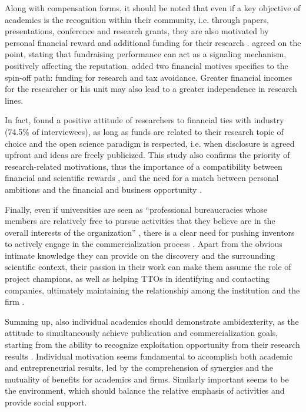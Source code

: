 Along with compensation forms, it should be noted that even if a key objective of academics is the recognition within their community, i.e. through papers, presentations, conference and research grants, they are also motivated by personal financial reward and additional funding for their research \citep{Siegel2003a, Link2007, Fini2009}. \citet{DEste2007, DEste2011} agreed on the point, stating that fundraising performance can act as a signaling mechanism, positively affecting the reputation. \citet{Rizzo2015} added two financial motives specifics to the spin-off path: funding for research and tax avoidance. Greater financial incomes for the researcher or his unit may also lead to a greater independence in research lines.

In fact, \citet{DEste2011} found a positive attitude of researchers to financial ties with industry (74.5\% of interviewees), as long as funds are related to their research topic of choice and the open science paradigm is respected, i.e. when disclosure is agreed upfront and ideas are freely publicized. This study also confirms the priority of research-related motivations, thus the importance of a compatibility between financial and scientific rewards \citep{Baldini2007, Link2007}, and the need for a match between personal ambitions and the financial and business opportunity \citep{Tijssen2006}.

Finally, even if universities are seen as \enquote{professional bureaucracies whose members are relatively free to pursue activities that they believe are in the overall interests of the organization} \citep{DEste2011}, there is a clear need for pushing inventors to actively engage in the commercialization process \citep{Jensen1998}. Apart from the obvious intimate knowledge they can provide on the discovery and the surrounding scientific context, their passion in their work can make them assume the role of project champions, as well as helping TTOs in identifying and contacting companies, ultimately maintaining the relationship among the institution and the firm \citep{Markman2005}.

Summing up, also individual academics should demonstrate ambidexterity, as the attitude to simultaneously achieve publication and commercialization goals, starting from the ability to recognize exploitation opportunity from their research results \citep{Chang2016}. Individual motivation seems fundamental to accomplish both academic and entrepreneurial results, led by the comprehension of synergies and the mutuality of benefits for academics and firms. Similarly important seems to be the environment, which should balance the relative emphasis of activities and provide social support. 

